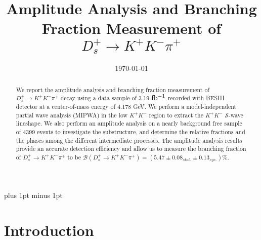 \documentclass[aps,prd,twocolumn,showpacs,amsmath,amssymb]{revtex4-1}
\begin{document}
\normalsize
\parskip=5pt plus 1pt minus 1pt

\linenumbers
\title{ \boldmath Amplitude Analysis and Branching Fraction Measurement of $D_{s}^{+} \rightarrow K^{+}K^{-}\pi^{+}$ }
\vspace{-1cm}
\author{}

\affiliation{}
\vspace{-4cm}
\date{\today}
\begin{abstract}
  We report the amplitude analysis and branching fraction measurement of $D_{s}^{+} \rightarrow K^{+}K^{-}\pi^{+}$ decay using a data sample of 3.19 $\rm fb^{-1}$ recorded with BESIII detector at a center-of-mass energy of 4.178 GeV. 
  We perform a model-independent partial wave analysis (MIPWA) in the low $K^{+}K^{-}$ region to extract the $K^{+}K^{-}$ $\mathcal{S}$-wave lineshape. 
  We also perform an amplitude analysis on a nearly background free sample of 4399 events to investigate the substructure, and determine the relative fractions and the phases among the different intermediate processes.
  The amplitude analysis results provide an accurate detection efficiency and allow us to measure the branching fraction of $D_{s}^{+} \rightarrow K^{+}K^{-}\pi^{+}$ to be $\mathcal{B}(D_{s}^{+} \rightarrow K^{+}K^{-}\pi^{+})=(5.47\pm0.08_{stat.}\pm0.13_{sys.})\%$.
\end{abstract}
\maketitle


\section{Introduction}
\label{sec:introduction}
    
\end{document}
